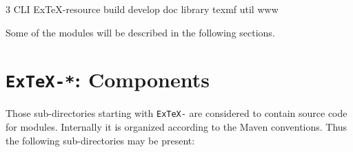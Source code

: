 {
\begin{multicols}3 \footnotesize\sf\obeylines
  CLI
  ExTeX-resource
  build
  develop
  doc
  library
  texmf
  util
  www
\end{multicols}
}


Some of the modules will be described in the following sections.


\section{\texttt{ExTeX-*}: Components}

Those sub-directories starting with \texttt{ExTeX-} are considered to
contain source code for modules. Internally it is organized according
to the Maven conventions. Thus the following sub-directories may be
present:

